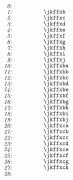 \[
\begin{picture}(420,530)(-68,-530)

\put(-68,0){\makebox(15,10)[r]{\it 0:}}%
\put(0,0){\makebox(100,10)[l]{}}
\put(-68,-10){\makebox(15,10)[r]{\it 1:}}%
\put(0,-10){\makebox(100,10)[l]{\jkffxb}}
\put(-68,-20){\makebox(15,10)[r]{\it 2:}}%
\put(0,-20){\makebox(100,10)[l]{\jkffxc}}
\put(-68,-30){\makebox(15,10)[r]{\it 3:}}%
\put(0,-30){\makebox(100,10)[l]{\jkffxd}}
\put(-68,-40){\makebox(15,10)[r]{\it 4:}}%
\put(0,-40){\makebox(100,10)[l]{\jkffxe}}
\put(-68,-50){\makebox(15,10)[r]{\it 5:}}%
\put(0,-50){\makebox(100,10)[l]{\jkffxf}}
\put(-68,-60){\makebox(15,10)[r]{\it 6:}}%
\put(0,-60){\makebox(100,10)[l]{\jkffxg}}
\put(-68,-70){\makebox(15,10)[r]{\it 7:}}%
\put(0,-70){\makebox(100,10)[l]{\jkffxh}}
\put(-68,-80){\makebox(15,10)[r]{\it 8:}}%
\put(0,-80){\makebox(100,10)[l]{\jkffxi}}
\put(-68,-90){\makebox(15,10)[r]{\it 9:}}%
\put(0,-90){\makebox(100,10)[l]{\jkffxj}}
\put(-68,-100){\makebox(15,10)[r]{\it 10:}}%
\put(0,-100){\makebox(100,10)[l]{\jkffxba}}
\put(-68,-110){\makebox(15,10)[r]{\it 11:}}%
\put(0,-110){\makebox(100,10)[l]{\jkffxbb}}
\put(-68,-120){\makebox(15,10)[r]{\it 12:}}%
\put(0,-120){\makebox(100,10)[l]{\jkffxbc}}
\put(-68,-130){\makebox(15,10)[r]{\it 13:}}%
\put(0,-130){\makebox(100,10)[l]{\jkffxbd}}
\put(-68,-140){\makebox(15,10)[r]{\it 14:}}%
\put(0,-140){\makebox(100,10)[l]{\jkffxbe}}
\put(-68,-150){\makebox(15,10)[r]{\it 15:}}%
\put(0,-150){\makebox(100,10)[l]{\jkffxbf}}
\put(-68,-160){\makebox(15,10)[r]{\it 16:}}%
\put(0,-160){\makebox(100,10)[l]{\jkffxbg}}
\put(-68,-170){\makebox(15,10)[r]{\it 17:}}%
\put(0,-170){\makebox(100,10)[l]{\jkffxbh}}
\put(-68,-180){\makebox(15,10)[r]{\it 18:}}%
\put(0,-180){\makebox(100,10)[l]{\jkffxbi}}
\put(-68,-190){\makebox(15,10)[r]{\it 19:}}%
\put(0,-190){\makebox(100,10)[l]{\jkffxbj}}
\put(-68,-200){\makebox(15,10)[r]{\it 20:}}%
\put(0,-200){\makebox(100,10)[l]{\jkffxca}}
\put(-68,-210){\makebox(15,10)[r]{\it 21:}}%
\put(0,-210){\makebox(100,10)[l]{\jkffxcb}}
\put(-68,-220){\makebox(15,10)[r]{\it 22:}}%
\put(0,-220){\makebox(100,10)[l]{\jkffxcc}}
\put(-68,-230){\makebox(15,10)[r]{\it 23:}}%
\put(0,-230){\makebox(100,10)[l]{\jkffxcd}}
\put(-68,-240){\makebox(15,10)[r]{\it 24:}}%
\put(0,-240){\makebox(100,10)[l]{\jkffxce}}
\put(-68,-250){\makebox(15,10)[r]{\it 25:}}%
\put(0,-250){\makebox(100,10)[l]{\jkffxcf}}
\put(-68,-260){\makebox(15,10)[r]{\it 26:}}%
\put(0,-260){\makebox(100,10)[l]{\jkffxcg}}
\put(-68,-270){\makebox(15,10)[r]{\it 27:}}%
\put(0,-270){\makebox(100,10)[l]{\jkffxch}}
\put(-68,-280){\makebox(15,10)[r]{\it 28:}}%

\end{picture}\]
